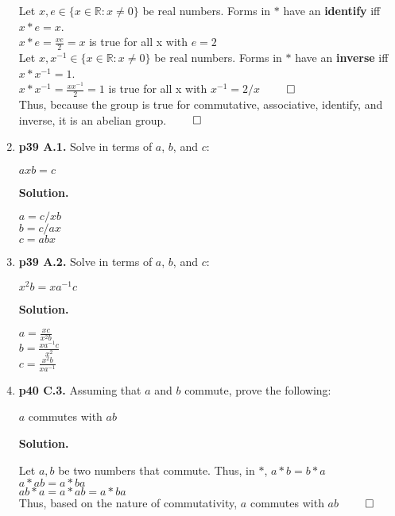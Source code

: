 \documentclass[11pt]{article}
\begin{document}
\begin{enumerate}
  Let $x,e \in \{x \in \mathbb{R} : x \neq 0\}$ be real numbers. Forms in $*$ have an {\bfseries identify} iff $x*e = x$. \\
  $x*e = \frac{xe}{2} = x$ is true for all x with $e = 2$\\
  
  Let $x,x^{-1} \in \{x \in \mathbb{R} : x \neq 0\}$ be real numbers. Forms in $*$ have an {\bfseries inverse} iff $x*x^{-1} = 1$. \\
  $x*x^{-1} = \frac{xx^{-1}}{2} = 1$ is true for all x with $x^{-1} = 2/x$ $\qed$\\
  
  Thus, because the group is true for commutative, associative, identify, and inverse, it is an abelian group. $\qed$\\

\newpage

\item {\bfseries p39 A.1.}
  Solve in terms of $a$, $b$, and $c$:
  
  $axb = c$
  
  {\bfseries Solution.}
  
  $a = c/xb$\\
  $b = c/ax$\\
  $c = abx$\\
 
\item {\bfseries p39 A.2.}
  Solve in terms of $a$, $b$, and $c$:
  
  $x^2b = xa^{-1}c$
  
  {\bfseries Solution.}
  
  $a = \frac{xc}{x^2b}$\\
  $b = \frac{xa^{-1}c}{x^2}$\\
  $c = \frac{x^2b}{xa^{-1}}$\\

\newpage

\item {\bfseries p40 C.3.}
  Assuming that $a$ and $b$ commute, prove the following:
  
  $a$ commutes with $ab$
  
  {\bfseries Solution.}
  
  Let $a,b$ be two numbers that commute. Thus, in $*$, $a*b = b*a$\\
  $a*ab = a*ba$\\
  $ab*a = a*ab = a*ba$\\
  Thus, based on the nature of commutativity, $a$ commutes with $ab$ $\qed$\\
 

\end{enumerate}
\end{document}
